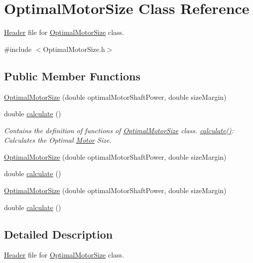 \hypertarget{class_optimal_motor_size}{}\section{Optimal\+Motor\+Size Class Reference}
\label{class_optimal_motor_size}


\hyperlink{class_header}{Header} file for \hyperlink{class_optimal_motor_size}{Optimal\+Motor\+Size} class.  




{\ttfamily \#include $<$Optimal\+Motor\+Size.\+h$>$}

\subsection*{Public Member Functions}
\begin{DoxyCompactItemize}
\item 
\hyperlink{class_optimal_motor_size_ad051dd00b8879fc4232536c936e98be1}{Optimal\+Motor\+Size} (double optimal\+Motor\+Shaft\+Power, double size\+Margin)
\item 
double \hyperlink{class_optimal_motor_size_aa9f4e68b9e1807d20e7738cd0789a539}{calculate} ()
\begin{DoxyCompactList}\small\item\em Contains the definition of functions of \hyperlink{class_optimal_motor_size}{Optimal\+Motor\+Size} class. \hyperlink{class_optimal_motor_size_aa9f4e68b9e1807d20e7738cd0789a539}{calculate()}\+: Calculates the Optimal \hyperlink{struct_motor}{Motor} Size. \end{DoxyCompactList}\item 
\hyperlink{class_optimal_motor_size_ad051dd00b8879fc4232536c936e98be1}{Optimal\+Motor\+Size} (double optimal\+Motor\+Shaft\+Power, double size\+Margin)
\item 
double \hyperlink{class_optimal_motor_size_aa9f4e68b9e1807d20e7738cd0789a539}{calculate} ()
\item 
\hyperlink{class_optimal_motor_size_ad051dd00b8879fc4232536c936e98be1}{Optimal\+Motor\+Size} (double optimal\+Motor\+Shaft\+Power, double size\+Margin)
\item 
double \hyperlink{class_optimal_motor_size_aa9f4e68b9e1807d20e7738cd0789a539}{calculate} ()
\end{DoxyCompactItemize}


\subsection{Detailed Description}
\hyperlink{class_header}{Header} file for \hyperlink{class_optimal_motor_size}{Optimal\+Motor\+Size} class. 

